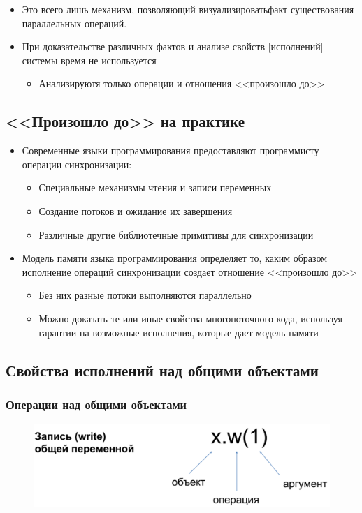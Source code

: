 \documentclass[10pt,a4paper,oneside,titlepage]{article}
\begin{document}
\begin{itemize}
	\item Это всего лишь механизм, позволяющий визуализироватьфакт существования параллельных операций.
	\item При доказательстве различных фактов и анализе свойств [исполнений] системы время не используется
	\begin{itemize}
		\item Анализируютя только операции и отношения <<произошло до>>
	\end{itemize}
\end{itemize}

\subsection{<<Произошло до>> на практике}
\begin{itemize}
	\item Современные языки программирования предоставляют программисту операции синхронизации:
	\begin{itemize}
		\item Специальные механизмы чтения и записи переменных
		\item Создание потоков и ожидание их завершения
		\item Различные другие библиотечные примитивы для синхронизации
	\end{itemize}
    \item Модель памяти языка программирования определяет то, каким образом исполнение операций синхронизации создает отношение <<произошло до>>
    \begin{itemize}
    	\item Без них разные потоки выполняются параллельно
    	\item Можно доказать те или иные свойства многопоточного кода, используя гарантии на возможные исполнения, которые дает модель памяти
    \end{itemize}
\end{itemize}

\subsection{Свойства исполнений над общими объектами}
\subsubsection{Операции над общими объектами}
\begin{figure}
	\centering
	\includegraphics[width=0.2\linewidth]{pictures/Write}
	\caption{}
	\label{fig:write}
\end{figure}
\end{document}
